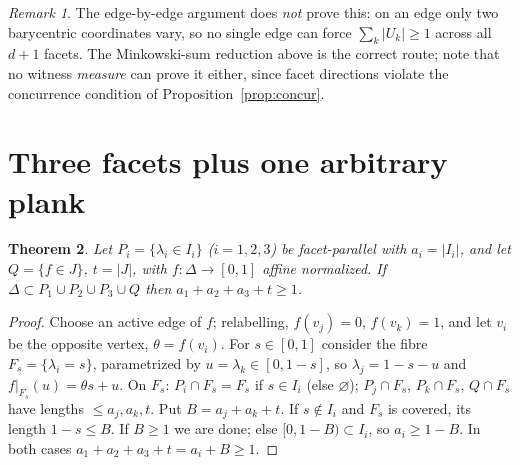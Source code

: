 \documentclass[11pt,reqno]{amsart}
\theoremstyle{plain}
\newtheorem{theorem}{Theorem}[section]
\theoremstyle{definition}
\theoremstyle{remark}
\newtheorem{remark}[theorem]{Remark}
\begin{document}
\begin{remark}
The edge-by-edge argument does \emph{not} prove this: on an edge only two
barycentric coordinates vary, so no single edge can force $\sum_k|U_k|\ge1$ across
all $d+1$ facets. The Minkowski-sum reduction above is the correct route; note that
no witness \emph{measure} can prove it either, since facet directions violate the
concurrence condition of Proposition~\ref{prop:concur}.
\end{remark}

\section{Three facets plus one arbitrary plank}\label{sec:3plus1}
\begin{theorem}\label{thm:3plus1}
Let $P_i=\{\lambda_i\in I_i\}$ ($i=1,2,3$) be facet-parallel with $a_i=|I_i|$, and
let $Q=\{f\in J\}$, $t=|J|$, with $f:\Delta\to[0,1]$ affine normalized. If
$\Delta\subset P_1\cup P_2\cup P_3\cup Q$ then $a_1+a_2+a_3+t\ge1$.
\end{theorem}
\begin{proof}
Choose an active edge of $f$; relabelling, $f(v_j)=0$, $f(v_k)=1$, and let $v_i$ be
the opposite vertex, $\theta=f(v_i)$. For $s\in[0,1]$ consider the fibre
$F_s=\{\lambda_i=s\}$, parametrized by $u=\lambda_k\in[0,1-s]$, so
$\lambda_j=1-s-u$ and $f|_{F_s}(u)=\theta s+u$. On $F_s$: $P_i\cap F_s=F_s$ if
$s\in I_i$ (else $\varnothing$); $P_j\cap F_s$, $P_k\cap F_s$, $Q\cap F_s$ have
lengths $\le a_j,a_k,t$. Put $B=a_j+a_k+t$. If $s\notin I_i$ and $F_s$ is covered,
its length $1-s\le B$. If $B\ge1$ we are done; else $[0,1-B)\subset I_i$, so
$a_i\ge1-B$. In both cases $a_1+a_2+a_3+t=a_i+B\ge1$.
\end{proof}
\end{document}

